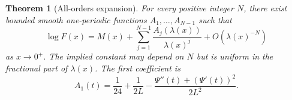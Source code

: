 \documentclass[11pt]{article}
\newtheorem{theorem}{Theorem}[section]
\theoremstyle{definition}
\theoremstyle{remark}
\begin{document}
\begin{theorem}[All-orders expansion]\label{thm:all-orders}
For every positive integer $N$, there exist bounded smooth one-periodic functions $A_1,\ldots,A_{N-1}$ such that
\begin{equation}\label{eq:all-orders}
\boxed{
 \log F(x)=M(x)+\sum_{j=1}^{N-1}
 \frac{A_j(\lambda(x))}{\lambda(x)^j}
 +O(\lambda(x)^{-N})}
\end{equation}
as $x\to0^+$.  The implied constant may depend on $N$ but is uniform in the fractional part of $\lambda(x)$.  The first coefficient is
\begin{equation}\label{eq:A1}
\boxed{
 A_1(t)=\frac1{24}+\frac1{2L}
 -\frac{\Psi''(t)+(\Psi'(t))^2}{2L^2}.}
\end{equation}
\end{theorem}
\end{document}
